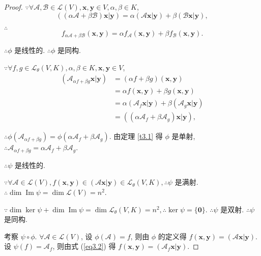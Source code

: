 \documentclass{ctexart}
\begin{document}
\begin{proof}
    $\because\forall\mathcal{A},\mathcal{B}\in\mathcal{L}(V),\boldsymbol{x},\boldsymbol{y}\in V,\alpha,\beta\in K$,
    \[((\alpha\mathcal{A}+\beta\mathcal{B})\boldsymbol{x}|\boldsymbol{y})=\alpha(\mathcal{A}\boldsymbol{x}|\boldsymbol{y})+\beta(\mathcal{B}\boldsymbol{x}|\boldsymbol{y}),\]
    
    $\therefore$
    \[f_{\alpha\mathcal{A}+\beta\mathcal{B}}(\boldsymbol{x},\boldsymbol{y})=\alpha f_{\mathcal{A}}(\boldsymbol{x},\boldsymbol{y})+\beta f_{\mathcal{B}}(\boldsymbol{x},\boldsymbol{y}).\]

    $\therefore\phi$ 是线性的. $\therefore\phi$ 是同构.

    $\because\forall f,g\in\mathcal{L}_\theta(V,K),\alpha,\beta\in K,\boldsymbol{x},\boldsymbol{y}\in V$,
    \begin{align*}
        (\mathcal{A}_{\alpha f+\beta g}\boldsymbol{x}|\boldsymbol{y}) & =(\alpha f+\beta g)(\boldsymbol{x},\boldsymbol{y}) \\
        & =\alpha f(\boldsymbol{x},\boldsymbol{y})+\beta g(\boldsymbol{x},\boldsymbol{y}) \\
        & =\alpha(\mathcal{A}_f\boldsymbol{x}|\boldsymbol{y})+\beta(\mathcal{A}_g\boldsymbol{x}|\boldsymbol{y}) \\
        & =((\alpha\mathcal{A}_f+\beta\mathcal{A}_g)\boldsymbol{x}|\boldsymbol{y}),
    \end{align*}

    $\therefore\phi(\mathcal{A}_{\alpha f+\beta g})=\phi(\alpha\mathcal{A}_f+\beta\mathcal{A}_g)$. 由定理 \ref{t3.1} 得 $\phi$ 是单射, $\therefore\mathcal{A}_{\alpha f+\beta g}=\alpha\mathcal{A}_f+\beta\mathcal{A}_g$.

    $\therefore\psi$ 是线性的.

    $\because\forall\mathcal{A}\in\mathcal{L}(V),f(\boldsymbol{x},\boldsymbol{y})\in(\mathcal{A}\boldsymbol{x}|\boldsymbol{y})\in\mathcal{L}_\theta(V,K),\therefore\psi$ 是满射. $\therefore\dim\operatorname{Im}\psi=\dim\mathcal{L}(V)=n^2$.

    $\because\dim\ker\psi+\dim\operatorname{Im}\psi=\dim\mathcal{L}_\theta(V,K)=n^2,\therefore\ker\psi=\{\boldsymbol{0}\}$. $\therefore\psi$ 是双射. $\therefore\psi$ 是同构.

    考察 $\psi\circ\phi$. $\forall\mathcal{A}\in\mathcal{L}(V)$, 设 $\phi(\mathcal{A})=f$, 则由 $\phi$ 的定义得 $f(\boldsymbol{x},\boldsymbol{y})=(\mathcal{A}\boldsymbol{x}|\boldsymbol{y})$. 设 $\psi(f)=\mathcal{A}_f$, 则由式 (\ref{eq3.2}) 得 $f(\boldsymbol{x},\boldsymbol{y})=(\mathcal{A}_f\boldsymbol{x}|\boldsymbol{y})$.
    

\end{proof}
\end{document}
